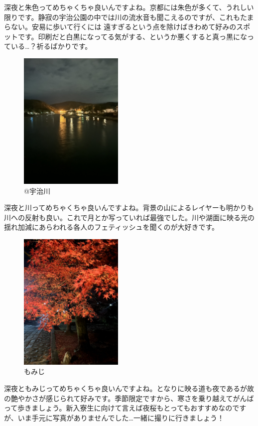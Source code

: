 深夜と朱色ってめちゃくちゃ良いんですよね。京都には朱色が多くて、うれしい限りです。静寂の宇治公園の中では川の流水音も聞こえるのですが、これもたまらない。安易に歩いて行くには
遠すぎるという点を除けばきわめて好みのスポットです。印刷だと白黒になってる気がする、というか悪くすると真っ黒になっている…？祈るばかりです。

\begin{figure}[H]
    \centering
    \includegraphics[width=5cm]{2025shinki/shinya_haikai/image2.png}
    \caption{@宇治川}
    \label{fig:enter-label2}
\end{figure}
深夜と川ってめちゃくちゃ良いんですよね。背景の山によるレイヤーも明かりも川への反射も良い。これで月とか写っていれば最強でした。川や湖面に映る光の揺れ加減にあらわれる各人のフェティッシュを聞くのが大好きです。

\begin{figure}[H]
    \centering
    \includegraphics[width=5cm]{2025shinki/shinya_haikai/image3.png}
    \caption{もみじ}
    \label{fig:enter-label3}
\end{figure}
深夜ともみじってめちゃくちゃ良いんですよね。となりに映る道も夜であるが故の艶やかさが感じられて好みです。季節限定ですから、寒さを乗り越えてがんばって歩きましょう。新入寮生に向けて言えば夜桜もとってもおすすめなのですが、いま手元に写真がありませんでした…一緒に撮りに行きましょう！

